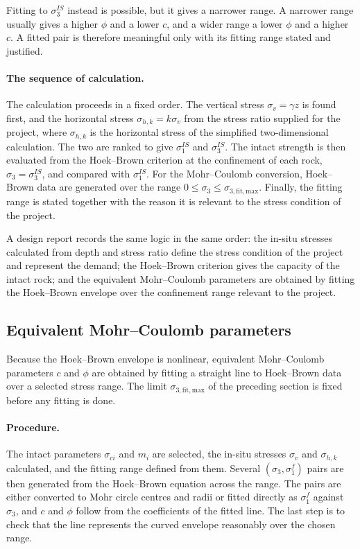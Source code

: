 Fitting to \(\sigma_3^{IS}\) instead is possible, but it gives a narrower
range. A narrower range usually gives a higher \(\phi\) and a lower \(c\),
and a wider range a lower \(\phi\) and a higher \(c\). A fitted pair is
therefore meaningful only with its fitting range stated and justified.

\paragraph{The sequence of calculation.}
The calculation proceeds in a fixed order. The vertical stress
\(\sigma_v = \gamma z\) is found first, and the horizontal stress
\(\sigma_{h,k} = k\sigma_v\) from the stress ratio supplied for the project,
where \(\sigma_{h,k}\) is the horizontal stress of the simplified
two-dimensional calculation. The two are ranked to give \(\sigma_1^{IS}\) and
\(\sigma_3^{IS}\). The intact strength is then evaluated from the Hoek--Brown
criterion at the confinement of each rock, \(\sigma_3 = \sigma_3^{IS}\), and
compared with \(\sigma_1^{IS}\). For the Mohr--Coulomb conversion,
Hoek--Brown data are generated over the range
\(0 \leq \sigma_3 \leq \sigma_{3,\mathrm{fit,max}}\). Finally, the fitting
range is stated together with the reason it is relevant to the stress
condition of the project.

A design report records the same logic in the same order: the in-situ
stresses calculated from depth and stress ratio define the stress condition
of the project and represent the demand; the Hoek--Brown criterion gives the
capacity of the intact rock; and the equivalent Mohr--Coulomb parameters are
obtained by fitting the Hoek--Brown envelope over the confinement range
relevant to the project.

\subsection{Equivalent Mohr--Coulomb parameters}
\label{sec:hb-to-mc-intact}

Because the Hoek--Brown envelope is nonlinear, equivalent Mohr--Coulomb
parameters \(c\) and \(\phi\) are obtained by fitting a straight line to
Hoek--Brown data over a selected stress range. The limit
\(\sigma_{3,\mathrm{fit,max}}\) of the preceding section is fixed before any
fitting is done.

\paragraph{Procedure.}
The intact parameters \(\sigma_{ci}\) and \(m_i\) are selected, the in-situ
stresses \(\sigma_v\) and \(\sigma_{h,k}\) calculated, and the fitting range
defined from them. Several \((\sigma_3,\sigma_1^f)\) pairs are then generated
from the Hoek--Brown equation across the range. The pairs are either
converted to Mohr circle centres and radii or fitted directly as
\(\sigma_1^f\) against \(\sigma_3\), and \(c\) and \(\phi\) follow from the
coefficients of the fitted line. The last step is to check that the line
represents the curved envelope reasonably over the chosen range.

